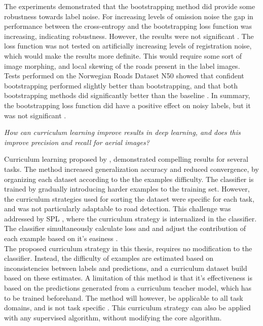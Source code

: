 The experiments demonstrated that the bootstrapping method did provide some robustness towards label noise. For increasing levels of omission noise the gap in performance between the cross-entropy and the bootstrapping loss function was increasing, indicating robustness. However, the results were not significant . The loss function was not tested on artificially increasing levels of registration noise, which would make the results more definite. This would require some sort of image morphing, and local skewing of the roads present in the label images. \\

Tests performed on the Norwegian Roads Dataset N50 showed that confident bootstrapping performed slightly better than bootstrapping, and that both bootstrapping methods did significantly better than the baseline . In summary, the bootstrapping loss function did have a positive effect on noisy labels, but it was not significant . 

\begin{description}[ style=nextline, leftmargin=1.5em, rightmargin=1.5em]
\item[Research question 2:]{\it How can curriculum learning improve results in deep learning, and does this improve precision and recall for aerial images?}
\end{description}

Curriculum learning proposed by \cite{Bengio_curriculumlearning}, demonstrated compelling results for several tasks. The method increased generalization accuracy and reduced convergence, by organizing each dataset according to the the examples difficulty. The classifier is trained by gradually introducing harder examples to the training set. However, the curriculum strategies used for sorting the dataset were specific for each task, and was not particularly adaptable to road detection. This challenge was addressed by \ac{SPL} \citep{Kumar_self_paced_learning}, where the curriculum strategy is internalized in the classifier. The classifier simultaneously calculate loss and and adjust the contribution of each example based on it's easiness  .\\

The proposed curriculum strategy in this thesis, requires no modification to the classifier. Instead, the difficulty of examples are estimated based on inconsistencies between labels and predictions, and a curriculum dataset build based on these estimates. A limitation of this method is that it's effectiveness is based on the predictions generated from a curriculum teacher model, which has to be trained beforehand. The method will however, be applicable to all task domains, and  is not task specific . This curriculum strategy can also be applied with any supervised algorithm, without modifying the core algorithm. \\


